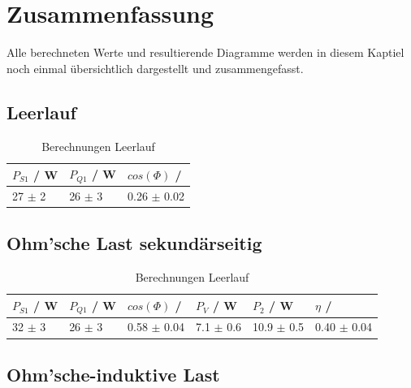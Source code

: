 \documentclass[12pt,a4paper,twoside]{article}
\begin{document}
\section{Zusammenfassung} %

Alle berechneten Werte und resultierende Diagramme werden in diesem Kaptiel noch einmal übersichtlich dargestellt und zusammengefasst. 

\subsection{Leerlauf}

\begin{table}[H]
    \centering
    \caption{Berechnungen Leerlauf}
    \label{tab:BerechnungenLeerlaufAW}
    \begin{tabular}{| l | l | l |}
        \hline
        $P_{S1}$ / W & $P_{Q1}$ / W & $cos(\Phi)$ / \\
        \hline
        27 $\pm$ 2 & 26 $\pm$ 3 & 0.26 $\pm$ 0.02 \\
        \hline
    \end{tabular}
\end{table}


\subsection{Ohm'sche Last sekundärseitig}

\begin{table}[H]
    \centering
    \caption{Berechnungen Leerlauf}
    \label{tab:BerechnungenLeerlaufAW}
    \begin{tabular}{| l | l | l | l | l | l |}
        \hline
        $P_{S1}$ / W & $P_{Q1}$ / W & $cos(\Phi)$ / & $P_{V}$ / W & $P_{2}$ / W & $\eta$ / \\
        \hline
        32 $\pm$ 3 & 26 $\pm$ 3 & 0.58 $\pm$ 0.04 & 7.1 $\pm$ 0.6 & 10.9 $\pm$ 0.5 & 0.40 $\pm$ 0.04 \\
        \hline
    \end{tabular}
\end{table}


\subsection{Ohm'sche-induktive Last}
\end{document}
